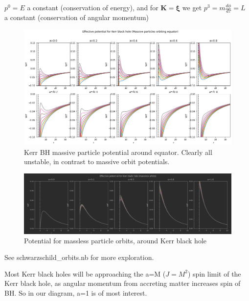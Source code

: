 $p^0=E$ a constant (conservation of energy), and for $\boldsymbol{K}=\boldsymbol{\xi}$ we get $p^3=m \frac{d\phi}{d\tau}=L$ a constant (conservation of angular momentum)



\begin{figure}
    \centering
    \includegraphics[width=\textwidth]{orbits_images/massive_particle_kerr_equator.png}
    \caption{Kerr BH massive particle potential around equator. Clearly all unstable, in contrast to massive orbit potentials.}
    \label{fig:Kerr BH massive particle potential around equator}
\end{figure}


\begin{figure}
    \centering
    \includegraphics[width=\textwidth]{orbits_images/kerr massless orbit potential.png}
    \caption{Potential for massless particle orbits, around Kerr black hole}
    \label{fig:Kerr massless potential}
\end{figure}

See schwarzschild\_orbits.nb for more exploration.


Most Kerr black holes will be approaching the a=M ($J=M^2$) spin limit of the Kerr black hole, as angular momentum from accreting matter increases spin of BH. So in our diagram, a=1 is of most interest.

